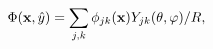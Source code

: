 \begin{equation}
 \Phi({\bf x},\hat{y})=\sum_{j,k}\phi_{jk}({\bf x})Y_{jk}(\theta,\varphi)/R,
\end{equation}

